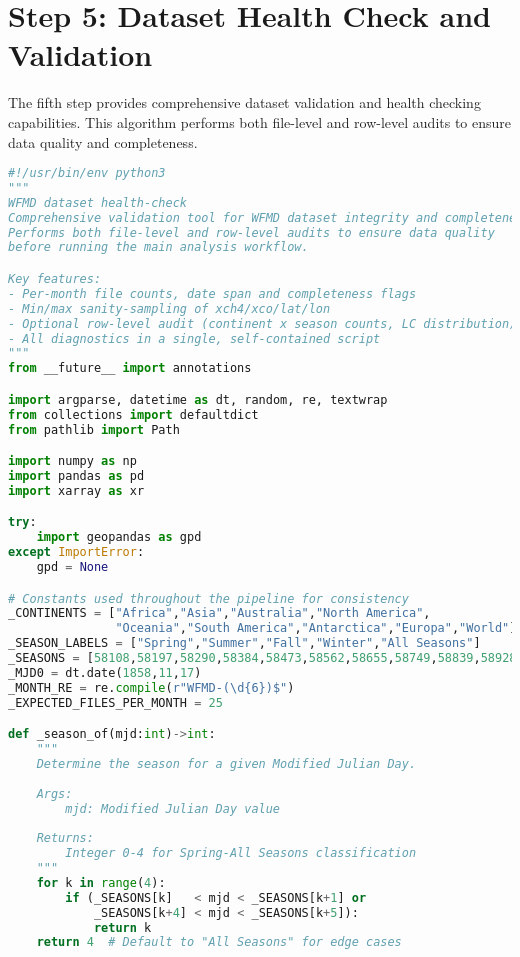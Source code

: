 \section{Step 5: Dataset Health Check and Validation}
\label{sec:appendixB_step5}

The fifth step provides comprehensive dataset validation and health checking capabilities. This algorithm performs both file-level and row-level audits to ensure data quality and completeness.

\begin{lstlisting}[language=Python, caption=Dataset Health Check Algorithm, label=alg:step05_health_check, breaklines=true]
#!/usr/bin/env python3
"""
WFMD dataset health-check
Comprehensive validation tool for WFMD dataset integrity and completeness.
Performs both file-level and row-level audits to ensure data quality
before running the main analysis workflow.

Key features:
- Per-month file counts, date span and completeness flags
- Min/max sanity-sampling of xch4/xco/lat/lon
- Optional row-level audit (continent x season counts, LC distribution)
- All diagnostics in a single, self-contained script
"""
from __future__ import annotations

import argparse, datetime as dt, random, re, textwrap
from collections import defaultdict
from pathlib import Path

import numpy as np
import pandas as pd
import xarray as xr

try:
    import geopandas as gpd
except ImportError:
    gpd = None

# Constants used throughout the pipeline for consistency
_CONTINENTS = ["Africa","Asia","Australia","North America",
               "Oceania","South America","Antarctica","Europa","World"]
_SEASON_LABELS = ["Spring","Summer","Fall","Winter","All Seasons"]
_SEASONS = [58108,58197,58290,58384,58473,58562,58655,58749,58839,58928,59020,59114]
_MJD0 = dt.date(1858,11,17)
_MONTH_RE = re.compile(r"WFMD-(\d{6})$")
_EXPECTED_FILES_PER_MONTH = 25

def _season_of(mjd:int)->int:
    """
    Determine the season for a given Modified Julian Day.
    
    Args:
        mjd: Modified Julian Day value
        
    Returns:
        Integer 0-4 for Spring-All Seasons classification
    """
    for k in range(4):
        if (_SEASONS[k]   < mjd < _SEASONS[k+1] or
            _SEASONS[k+4] < mjd < _SEASONS[k+5]):
            return k
    return 4  # Default to "All Seasons" for edge cases


\end{lstlisting}
